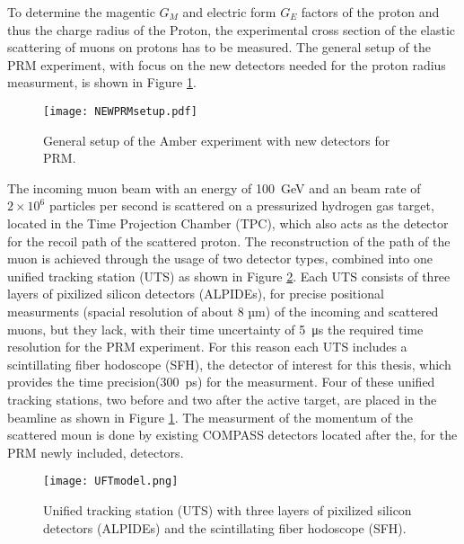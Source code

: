 To determine the magentic $G_M$ and electric form $G_E$ factors of the proton and thus the charge radius of the Proton,
the experimental cross section of the elastic scattering of muons on protons has to be measured.
The general setup of the PRM experiment, with focus on the new detectors needed for the proton radius measurment, is shown in Figure \ref{fig:amber_setup}.
\begin{figure}[H]
	\centering
	\texttt{[image: NEWPRMsetup.pdf]}
	\caption{General setup of the Amber experiment with new detectors for PRM.\autocite{InternalcommunicationKarl}}
	\label{fig:amber_setup}
\end{figure}
The incoming muon beam with an energy of \SI{100} {\giga\electronvolt}\autocite{ProposalAmber} and an beam rate of $2 \times 10^6$\autocite{ConfrancePaperDAQ} particles per second is scattered on a pressurized hydrogen gas target,
located in the Time Projection Chamber (TPC), 
which also acts as the detector for the recoil path of the scattered proton.
\newline
The reconstruction of the path of the muon is achieved through the usage of two detector types,
combined into one unified tracking station (UTS) as shown in Figure \ref{UTSpicture}.
\newline
Each UTS consists of three layers of pixilized silicon detectors (ALPIDEs), for precise positional measurments (spacial resolution of about 8 µm\autocite{Amber2022Status}) of the incoming and scattered muons, 
but they lack, with their time uncertainty of \SI{5} {\micro\second}\autocite{Amber2022Status} the required time resolution for the PRM experiment.
For this reason each UTS includes a scintillating fiber hodoscope (SFH), the detector of interest for this thesis,
which provides the time precision(\SI{300} {\pico\second}\Autocite{Amber2022Status}) for the measurment.
\newline
Four of these unified tracking stations, two before and two after the active target, are placed in the beamline as shown in Figure \ref{fig:amber_setup}.
The measurment of the momentum of the scattered moun is done by existing COMPASS detectors located after the, 
for the PRM newly included, detectors\autocite{ProposalAmber}.

\begin{figure}[H]	
	\centering
	\texttt{[image: UFTmodel.png]}
	\caption{Unified tracking station (UTS) with three layers of pixilized silicon detectors (ALPIDEs) and the scintillating fiber hodoscope (SFH).\autocite{InternalcommunicationKarl}}
	\label{UTSpicture}
\end{figure}

